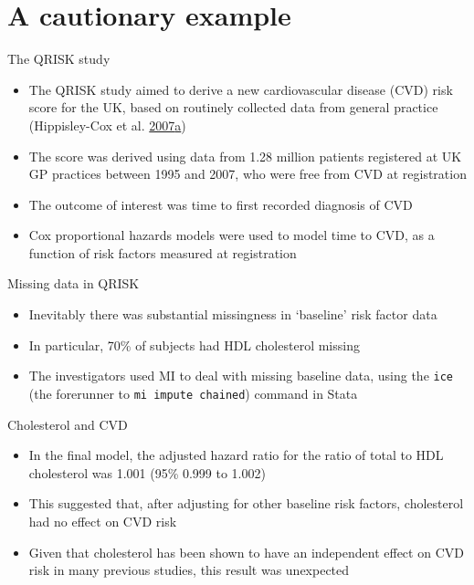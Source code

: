 \documentclass[ignorenonframetext,]{beamer}
\providecommand{\tightlist}{%
  \setlength{\itemsep}{0pt}\setlength{\parskip}{0pt}}
\begin{document}
\hypertarget{a-cautionary-example}{%
\section{A cautionary example}\label{a-cautionary-example}}

\begin{frame}{The QRISK study}
\protect\hypertarget{the-qrisk-study}{}

\begin{itemize}
\tightlist
\item
  The QRISK study aimed to derive a new cardiovascular disease (CVD)
  risk score for the UK, based on routinely collected data from general
  practice (Hippisley-Cox et al.
  \protect\hyperlink{ref-Hippisley-Cox2007}{2007}\protect\hyperlink{ref-Hippisley-Cox2007}{a})
\item
  The score was derived using data from 1.28 million patients registered
  at UK GP practices between 1995 and 2007, who were free from CVD at
  registration
\item
  The outcome of interest was time to first recorded diagnosis of CVD
\item
  Cox proportional hazards models were used to model time to CVD, as a
  function of risk factors measured at registration
\end{itemize}

\end{frame}

\begin{frame}[fragile]{Missing data in QRISK}
\protect\hypertarget{missing-data-in-qrisk}{}

\begin{itemize}
\tightlist
\item
  Inevitably there was substantial missingness in `baseline' risk factor
  data
\item
  In particular, 70\% of subjects had HDL cholesterol missing
\item
  The investigators used MI to deal with missing baseline data, using
  the \texttt{ice} (the forerunner to \texttt{mi\ impute\ chained})
  command in Stata
\end{itemize}

\end{frame}

\begin{frame}{Cholesterol and CVD}
\protect\hypertarget{cholesterol-and-cvd}{}

\begin{itemize}
\tightlist
\item
  In the final model, the adjusted hazard ratio for the ratio of total
  to HDL cholesterol was 1.001 (95\% 0.999 to 1.002)
\item
  This suggested that, after adjusting for other baseline risk factors,
  cholesterol had no effect on CVD risk
\item
  Given that cholesterol has been shown to have an independent effect on
  CVD risk in many previous studies, this result was unexpected
\end{itemize}

\end{frame}
\end{document}
